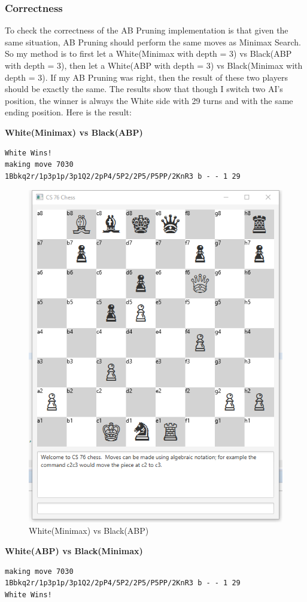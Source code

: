 \documentclass{article}
\begin{document}
\subsubsection{Correctness}
To check the correctness of the AB Pruning implementation is that given the same situation, AB Pruning should perform the same moves as Minimax Search. So my method is to first let a White(Minimax with depth = 3) vs Black(ABP with depth = 3), then let a White(ABP with depth = 3) vs Black(Minimax with depth = 3). If my AB Pruning was right, then the result of these two players should be exactly the same. The results show that though I switch two AI's position, the winner is always the White side with 29 turns and with the same ending position. Here is the result:

\clearpage
\textbf{White(Minimax) vs Black(ABP)}
\begin{lstlisting}
White Wins!
making move 7030
1Bbkq2r/1p3p1p/3p1Q2/2pP4/5P2/2P5/P5PP/2KnR3 b - - 1 29
\end{lstlisting}

\begin{figure}[H]
\centering
\includegraphics[width=0.7\linewidth]{W_MINI_B_ABP}
\caption{White(Minimax) vs Black(ABP)}
\end{figure}

\clearpage
\textbf{White(ABP) vs Black(Minimax)}
\begin{lstlisting}
making move 7030
1Bbkq2r/1p3p1p/3p1Q2/2pP4/5P2/2P5/P5PP/2KnR3 b - - 1 29
White Wins!
\end{lstlisting}
\end{document}
